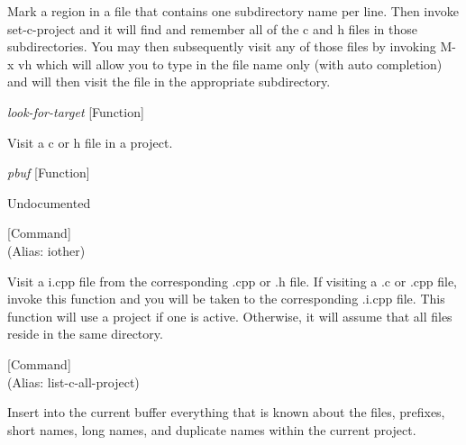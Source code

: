 \begin{doc-string}
Mark a region in a file that contains one subdirectory name per line.
Then invoke set-c-project and it will find and remember all of the c and h
files in those subdirectories.  You may then subsequently visit any of
those files by invoking M-x vh which will allow you to type in the file
name only (with auto completion) and will then visit the file in the
appropriate subdirectory.
\end{doc-string}

\vspace{1em}
\noindent
{}
\usebox{\funcname}\emph{look-for-target}
 \hfill [Function]

\begin{doc-string}
Visit a c or h file in a project.
\end{doc-string}

\vspace{1em}
\noindent
{}
\usebox{\funcname}\emph{pbuf}
 \hfill [Function]

\begin{doc-string}
Undocumented
\end{doc-string}

\vspace{1em}
\noindent
{}
\usebox{\funcname}
 \hfill [Command]\\%
 (Alias: iother)

\begin{doc-string}
Visit a i.cpp file from the corresponding .cpp or .h file.  If visiting a .c
or .cpp file, invoke this function and you will be taken to the corresponding
.i.cpp file.  This function will use a project if one is active.  Otherwise, it
will assume that all files reside in the same directory.
\end{doc-string}

\vspace{1em}
\noindent
{}
\usebox{\funcname}
 \hfill [Command]\\%
 (Alias: list-c-all-project)

\begin{doc-string}
Insert into the current buffer everything that is known about the files,
prefixes, short names, long names, and duplicate names within the current
project.
\end{doc-string}

